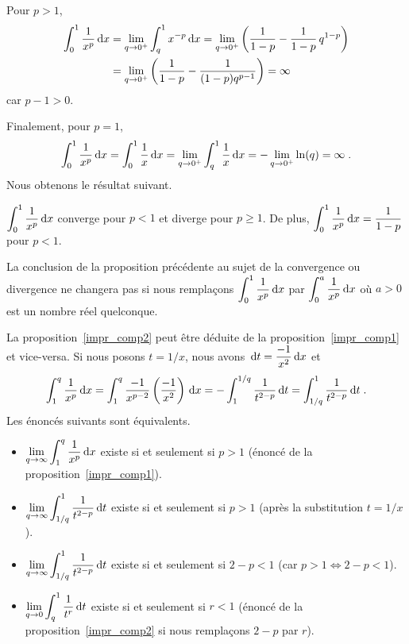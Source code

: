 {Pour $p>1$,
\begin{align*}
\int_0^1 \frac{1}{x^p} \,\mathrm{d}x
&= \lim_{q\rightarrow 0^+} \int_q^1 x^{-p} \,\mathrm{d}x
= \lim_{q\rightarrow 0^+}
\left( \frac{1}{1-p} - \frac{1}{1-p} \, q^{1-p} \right) \\
&= \lim_{q\rightarrow 0^+}
\left( \frac{1}{1-p} - \frac{1}{(1-p)q^{p-1}} \right)
= \infty
\end{align*}
car $p-1>0$.

Finalement, pour $p=1$,
\[
\int_0^1 \frac{1}{x^p} \,\mathrm{d}x = \int_0^1 \frac{1}{x} \,\mathrm{d}x
= \lim_{q\rightarrow 0^+} \int_q^1 \frac{1}{x} \,\mathrm{d}x
= - \lim_{q\rightarrow 0^+} \ln(q) = \infty \; .
\]
Nous obtenons le résultat suivant.

\begin{prop}
$\displaystyle \int_0^1 \frac{1}{x^p} \,\mathrm{d}x$ converge pour
$p<1$ et diverge pour $p\geq 1$.  De plus,
$\displaystyle \int_0^1 \frac{1}{x^p} \,\mathrm{d}x = \frac{1}{1-p}$
pour $p<1$.
\label{impr_comp2}
\end{prop}

La conclusion de la proposition précédente au sujet de la convergence
ou divergence ne changera pas si nous remplaçons
$\displaystyle \int_0^1 \frac{1}{x^p} \,\mathrm{d}x$ par
$\displaystyle \int_0^a \frac{1}{x^p} \,\mathrm{d}x$
où $a>0$ est un nombre réel quelconque.

\begin{rmk}[\theory]
La proposition~\ref{impr_comp2} peut être déduite de la
proposition~\ref{impr_comp1} et vice-versa.  Si nous posons $t=1/x$,
nous avons $\displaystyle \,\mathrm{d}t = \frac{-1}{x^2} \,\mathrm{d}x$ et
\[
\int_1^q \frac{1}{x^p} \,\mathrm{d}x
= \int_1^q \frac{-1}{x^{p-2}}\left(\frac{-1}{x^2}\right) \,\mathrm{d}x \\
= -\int_1^{1/q} \frac{1}{t^{2-p}} \,\mathrm{d}t
= \int_{1/q}^1 \frac{1}{t^{2-p}} \,\mathrm{d}t \; .
\]
Les énoncés suivants sont équivalents.

{
\renewcommand{\labelitemi}{$\Leftrightarrow$}
\begin{itemize}
\item[] $\displaystyle \lim_{q\to \infty} \int_1^q \frac{1}{x^p} \,\mathrm{d}x$
existe si et seulement si $p>1$ (énoncé de la proposition~\ref{impr_comp1}).
\item $\displaystyle \lim_{q\to \infty} \int_{1/q}^1 \frac{1}{t^{2-p}} \,\mathrm{d}t$
existe si et seulement si $p>1$ (après la substitution $t = 1/x$).
\item $\displaystyle \lim_{q\to \infty} \int_{1/q}^1 \frac{1}{t^{2-p}} \,\mathrm{d}t$
existe si et seulement si $2-p < 1$ (car $p>1 \Leftrightarrow 2-p <1$).
\item $\displaystyle \lim_{q\to 0} \int_q^1 \frac{1}{t^r} \,\mathrm{d}t$
existe si et seulement si $r<1$ (énoncé de la
proposition~\ref{impr_comp2} si nous remplaçons $2-p$ par $r$).
\end{itemize}
}\end{rmk}

}
